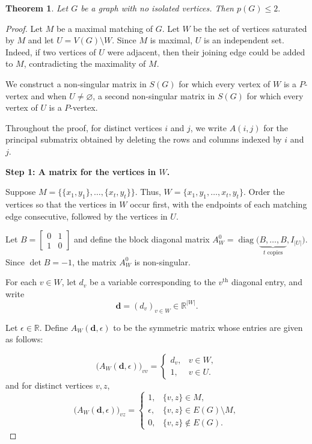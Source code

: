 \documentclass[12pt,reqno]{amsart}
\theoremstyle{plain}
\newtheorem{theorem}{Theorem}
\theoremstyle{definition}
\theoremstyle{block}
\theoremstyle{remark}
\numberwithin{equation}{section}
\begin{document}




\begin{theorem}\label{thm:main}
Let \(G\) be a graph with no isolated vertices. Then
\(
p(G)\leq 2.
\)
\end{theorem}

\begin{proof}
Let \(M\) be a maximal matching of \(G\). Let \(W\) be the set of
vertices saturated by \(M\) and let
\(
U=V(G)\setminus W.
\)
Since \(M\) is maximal, \(U\) is an independent set. Indeed, if two
vertices of \(U\) were adjacent, then their joining edge could be added
to \(M\), contradicting the maximality of \(M\).

We construct a non-singular matrix in \(S(G)\) for which every vertex
of \(W\) is a \(P\)-vertex and when \(U\neq\varnothing\), a second
non-singular matrix in \(S(G)\) for which every vertex of \(U\) is a
\(P\)-vertex.

Throughout the proof, for distinct vertices \(i\) and \(j\), we write
\(A(i,j)\) for the principal submatrix obtained by deleting the rows
and columns indexed by \(i\) and \(j\).

\medskip

\noindent
\textbf{Step 1: A matrix for the vertices in \(W\).}

Suppose
\(
M=\bigl\{\{x_1,y_1\},\ldots,\{x_t,y_t\}\bigr\}.
\)
Thus,
\(
W=\{x_1,y_1,\ldots,x_t,y_t\}.
\)
Order the vertices so that the vertices in \(W\) occur first, with the
endpoints of each matching edge consecutive, followed by the vertices
in \(U\).

Let
\(
B=
\begin{bmatrix}
0&1\\
1&0
\end{bmatrix}
\)
and define the block diagonal matrix
\(
A_W^0=
\operatorname{diag}
\bigl(
\underbrace{B,\ldots,B}_{t\text{ copies}},
I_{|U|}
\bigr).
\)
Since \(\det B=-1\), the matrix \(A_W^0\) is non-singular.

For each \(v\in W\), let \(d_v\) be a variable corresponding to the
\(v^\text{th}\) diagonal entry, and write
\[
\mathbf d=(d_v)_{v\in W}\in\mathbb R^{|W|}.
\]

Let \(\epsilon\in\mathbb R\). Define \(A_W(\mathbf d,\epsilon)\) to be
the symmetric matrix whose entries are given as follows:

\[
\bigl(A_W(\mathbf d,\epsilon)\bigr)_{vv}
=
\begin{cases}
d_v, & v\in W,\\
1,   & v\in U.
\end{cases}
\]
and for distinct vertices \(v,z\),
\[
\bigl(A_W(\mathbf d,\epsilon)\bigr)_{vz}
=
\begin{cases}
1,
& \{v,z\}\in M,\\
\epsilon,
& \{v,z\}\in E(G)\setminus M,\\
0,
& \{v,z\}\notin E(G).
\end{cases}
\]


\end{proof}
\end{document}
